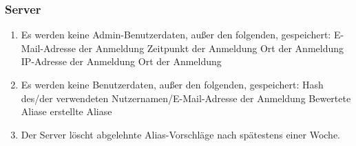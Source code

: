 \subsubsection{Server}

\begin{enumerate}
    \item Es werden keine Admin-Benutzerdaten, außer den folgenden, gespeichert:
        \subitem E-Mail-Adresse der Anmeldung
        \subitem Zeitpunkt der Anmeldung
        \subitem Ort der Anmeldung
        \subitem IP-Adresse der Anmeldung
        \subitem Ort der Anmeldung
    \item Es werden keine Benutzerdaten, außer den folgenden, gespeichert:
        \subitem Hash des/der verwendeten Nutzernamen/E-Mail-Adresse der Anmeldung
        \subitem Bewertete Aliase
        \subitem erstellte Aliase
    \item Der Server löscht abgelehnte Alias-Vorschläge nach spätestens einer Woche.
\end{enumerate}